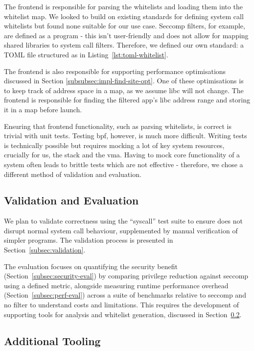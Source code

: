 The frontend is responsible for parsing the \af whitelists and loading them into
the whitelist map. We looked to build on existing standards for defining
system call whitelists but found none suitable for our use case. Seccomp filters,
for example, are defined as a  program - this isn't user-friendly and
does not allow for mapping shared libraries to system call filters. Therefore, we defined our
own standard: a TOML file structured as in Listing~\ref{lst:toml-whitelist}.

The frontend is also responsible for supporting performance optimisations
discussed in Section \ref{subsubsec:impl-find-site-opt}. One of these optimisations is
to keep track of  address space in a map, as we assume \ac{libc} will not
change. The frontend is responsible for finding the filtered app's \ac{libc}
address range and storing it in a map before launch.

Ensuring that frontend functionality, such as parsing whitelists, is correct is
trivial with unit tests. Testing \ac{bpf}, however, is much more difficult.
Writing tests is technically possible but requires mocking a lot of key system
resources, crucially for us, the stack and the \ac{vma}. Having to mock core
functionality of a system often leads to brittle tests which are not effective -
therefore, we chose a different method of validation and evaluation.

\subsection{Validation and Evaluation}

We plan to validate correctness using the  ``syscall'' test
suite to ensure \af does not disrupt normal system call behaviour, supplemented
by manual verification of simpler programs. The validation process is presented
in Section~\ref{subsec:validation}.

The evaluation focuses on quantifying the security benefit
(Section~\ref{subsec:security-eval}) by comparing privilege reduction
against seccomp using a defined metric, alongside measuring runtime
performance overhead (Section~\ref{subsec:perf-eval}) across a suite of
benchmarks relative to seccomp and no filter to understand costs and
limitations. This requires the development of supporting tools for analysis
and whitelist generation, discussed in 
Section~\ref{subsubsec:additional-tooling}.

\subsection{Additional Tooling}\label{subsubsec:additional-tooling}


